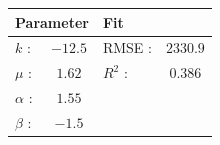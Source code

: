 \documentclass[11pt]{article} %
\begin{document}


\begin{center}
\begin{tabular}{lclc}
 \multicolumn{2}{l}{Parameter} 	& \multicolumn{2}{l}{Fit } \\ \hline	 
 $k$ : 		& $-12.5$ 	& RMSE :	&  $2330.9$	  	\\
 $\mu$ :	& $1.62$	& $R^2$ :	&  	$0.386$  	\\
 $\alpha$ :	& $1.55$	&  			&  	  			\\
 $\beta$ :	& $-1.5$	& 	 		&
\end{tabular}
\label{unconstrained}
\end{center} 




\end{document}
